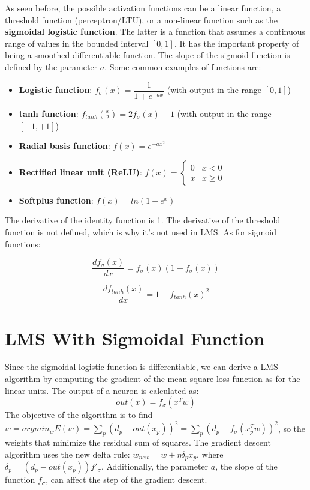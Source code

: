 As seen before, the possible activation functions can be a linear function, a threshold function (perceptron/LTU), or a non-linear function such as the \textbf{sigmoidal logistic function}. The latter is a function that assumes a continuous range of values in the bounded interval $[0,1]$. It has the important property of being a smoothed differentiable function. The slope of the sigmoid function is defined by the parameter $a$. Some common examples of functions are:
\begin{itemize}
    \item \textbf{Logistic function}: $f_{\sigma}(x) = \dfrac{1}{1+e^{-ax}}$ (with output in the range $[0,1]$)

    \item \textbf{tanh function}: $f_{tanh}(\frac{x}{2}) = 2f_{\sigma}(x) - 1$ (with output in the range $[-1,+1]$)

    \item \textbf{Radial basis function}: $f(x) = e^{-ax^2}$

    \item \textbf{Rectified linear unit (ReLU)}:
    $f(x) = \begin{cases}
            0 & x < 0 \\
            x & x \geq 0
            \end{cases}$

    \item \textbf{Softplus function}: $f(x) = ln(1+e^x)$
\end{itemize}
The derivative of the identity function is 1. The derivative of the threshold function is not defined, which is why it's not used in LMS. As for sigmoid functions:

\begin{equation*}
    \dfrac{df_{\sigma}(x)}{dx} = f_{\sigma}(x)(1-f_{\sigma}(x)) 
\end{equation*}

\begin{equation*}
    \dfrac{df_{tanh}(x)}{dx} = 1 - f_{tanh}(x)^2
\end{equation*}

\section{LMS With Sigmoidal Function}

Since the sigmoidal logistic function is differentiable, we can derive a LMS algorithm by computing the gradient of the mean square loss function as for the linear units. The output of a neuron is calculated as:
\begin{equation*}
    out(x) = f_{\sigma}(x^Tw)
\end{equation*}
The objective of the algorithm is to find $w = argmin_w E(w) = \sum_p (d_p - out(x_p))^2 = \sum_p (d_p - f_{\sigma}(x_p^Tw))^2$, so the weights that minimize the residual sum of squares. The gradient descent algorithm uses the new delta rule: $w_{new} = w + \eta \delta_p x_p$, where $\delta_p = (d_p - out(x_p))f'_{\sigma}$. Additionally, the parameter $a$, the slope of the function $f_{\sigma}$, can affect the step of the gradient descent.

